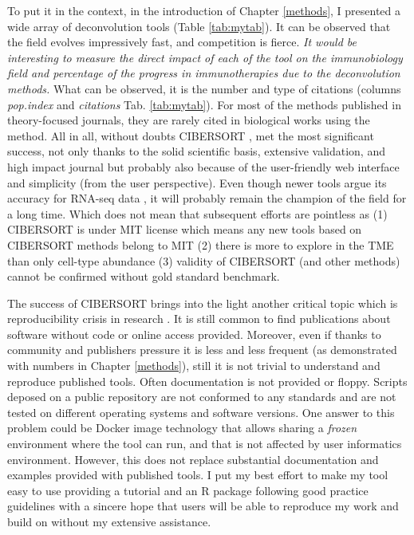 \documentclass[12pt,]{book}
\theoremstyle{definition}
\theoremstyle{definition}
\theoremstyle{definition}
\theoremstyle{remark}
\begin{document}
To put it in the context, in the introduction of Chapter \ref{methods},
I presented a wide array of deconvolution tools (Table \ref{tab:mytab}).
It can be observed that the field evolves impressively fast, and
competition is fierce. \emph{It would be interesting to measure the
direct impact of each of the tool on the immunobiology field and
percentage of the progress in immunotherapies due to the deconvolution
methods.} What can be observed, it is the number and type of citations
(columns \emph{pop.index} and \emph{citations} Tab. \ref{tab:mytab}).
For most of the methods published in theory-focused journals, they are
rarely cited in biological works using the method. All in all, without
doubts CIBERSORT \citep{Newman2015}, met the most significant success,
not only thanks to the solid scientific basis, extensive validation, and
high impact journal but probably also because of the user-friendly web
interface and simplicity (from the user perspective). Even though newer
tools argue its accuracy for RNA-seq data \citep{Li2017, Tamborero2018},
it will probably remain the champion of the field for a long time. Which
does not mean that subsequent efforts are pointless as (1) CIBERSORT is
under MIT license which means any new tools based on CIBERSORT methods
belong to MIT (2) there is more to explore in the TME than only
cell-type abundance (3) validity of CIBERSORT (and other methods) cannot
be confirmed without gold standard benchmark.

The success of CIBERSORT brings into the light another critical topic
which is reproducibility crisis in research \citep{Fanelli2018}. It is
still common to find publications about software without code or online
access provided. Moreover, even if thanks to community and publishers
pressure it is less and less frequent (as demonstrated with numbers in
Chapter \ref{methods}), still it is not trivial to understand and
reproduce published tools. Often documentation is not provided or
floppy. Scripts deposed on a public repository are not conformed to any
standards and are not tested on different operating systems and software
versions. One answer to this problem could be Docker image technology
\citep{Boettiger2014} that allows sharing a \emph{frozen} environment
where the tool can run, and that is not affected by user informatics
environment. However, this does not replace substantial documentation
and examples provided with published tools. I put my best effort to make
my tool easy to use providing a tutorial and an R package following good
practice guidelines with a sincere hope that users will be able to
reproduce my work and build on without my extensive assistance.
\end{document}
